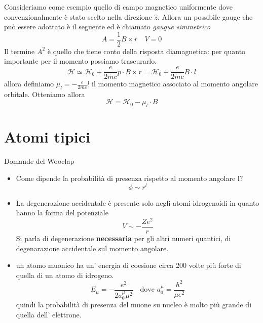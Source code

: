 \documentclass[11pt,a4paper]{article}
\theoremstyle{springer}
\theoremstyle{definition}
\theoremstyle{remark}
\begin{document}
Consideriamo come esempio quello di campo magnetico uniformente dove convenzionalmente è stato scelto nella direzione $\hat{z}$. Allora un possibile gauge che può essere adottato è il seguente ed è chiamato \textit{gaugue simmetrico}
\begin{equation*}
  A = \frac{1}{2}B \times r \quad V = 0
\end{equation*}
Il termine $A^2$ è quello che tiene conto della risposta diamagnetica: per quanto importante per il momento possiamo trascurarlo.
\begin{equation*}
  \mathcal{H} \simeq \mathcal{H}_0 +\frac{e}{2mc}p \cdot B \times r  = \mathcal{H}_0 + \frac{e}{2mc} B \cdot l
\end{equation*}
allora definiamo $\mu_l =  -\frac{e}{2mc}l$ il momento magnetico associato al momento angolare orbitale. Otteniamo allora
\begin{equation*}
  \mathcal{H} = \mathcal{H}_0 -\mu_l \cdot B
\end{equation*}

\section{Atomi tipici}
\begin{greenbox}{Domande del Wooclap}
  \begin{itemize}
    \item Come dipende la probabilità di presenza rispetto al momento angolare l? \\
      \begin{equation*}
        \phi \sim r^{l}
      \end{equation*}
    \item La degenerazione accidentale è presente solo negli atomi idrogenoidi in quanto hanno la forma del potenziale 
      \begin{equation*}
        V \sim -\frac{Ze^2}{r}
      \end{equation*}
      Si parla di degenerazione \textbf{necessaria} per gli altri numeri quantici, di degenarazione accidentale sul momento angolare.
    \item un atomo muonico ha un' energia di coesione circa 200 volte più forte di quella di un atomo di idrogeno.
      \begin{equation*}
        E_\mu = -\frac{e^2}{2a_0^\mu \mu^2} \quad \text{dove } a_0^\mu = \frac{\hbar^2}{\mu e^2}
      \end{equation*}
      quindi la probabilità di presenza del muone su nucleo è molto più grande di quella dell' elettrone.
  \end{itemize}
\end{greenbox}
\end{document}
